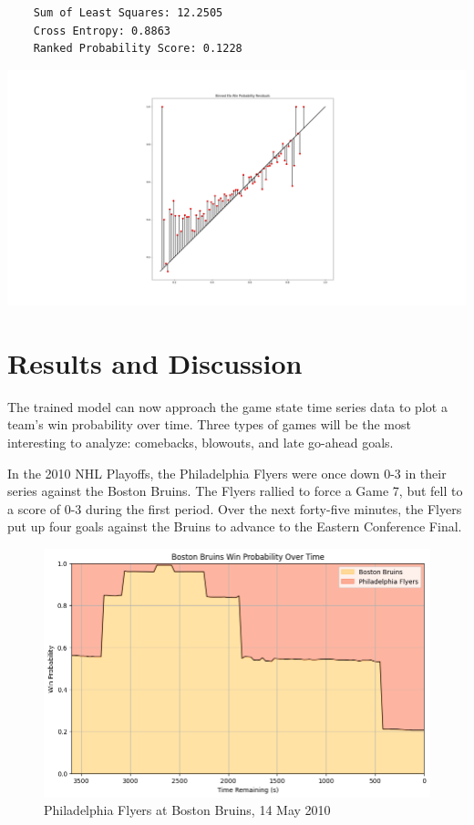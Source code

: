 \documentclass{article}
\begin{document}
\begin{minipage}{0.45\textwidth}
  \vspace*{0pt}
  \centering
  \begin{verbatim}
    Sum of Least Squares: 12.2505
    Cross Entropy: 0.8863
    Ranked Probability Score: 0.1228
  \end{verbatim}
  \end{minipage}
  \hfill
  \begin{minipage}{0.45\textwidth}
  \includegraphics[width=2\textwidth]{elo_residuals.png}\\

\end{minipage}

\section{Results and Discussion}
The trained model can now approach the game state time series data to plot a team's win probability over time.
Three types of games will be the most interesting to analyze: comebacks, blowouts, and late go-ahead goals.

In the 2010 NHL Playoffs, the Philadelphia Flyers were once down 0-3 in their series against the Boston Bruins.
The Flyers rallied to force a Game 7, but fell to a score of 0-3 during the first period.
Over the next forty-five minutes, the Flyers put up four goals against the Bruins to advance to the Eastern Conference Final.

\begin{figure}
    \centering
    \includegraphics[width=1.0\linewidth]{2009030227.png}
    \caption{Philadelphia Flyers at Boston Bruins, 14 May 2010}
    \label{fig:comeback}
\end{figure}
\end{document}
